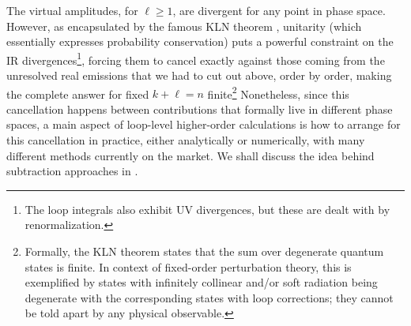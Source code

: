 %
%
%
%
%
The virtual amplitudes, for $\ell \ge 1$, are divergent
for any point in phase space. However, as encapsulated by the famous KLN theorem
\cite{Kinoshita:1962ur,Lee:1964is}, unitarity (which essentially
expresses probability conservation) puts a powerful
constraint on the IR divergences\footnote{The loop integrals also
  exhibit UV divergences, but these are dealt with by
  renormalization.}, 
forcing them to cancel exactly 
against those coming from the unresolved real emissions 
that we had to cut out above, order by order, 
making the complete answer for fixed
$k+\ell = n$ finite\footnote{Formally, the KLN theorem states that the
sum over degenerate quantum states is finite. In context of
fixed-order perturbation theory, this is exemplified by states with infinitely
collinear and/or soft radiation being degenerate with the
corresponding states with loop corrections; they cannot be told apart
by any physical observable.}
Nonetheless, since this cancellation happens
between contributions that formally live in different phase spaces, 
a main aspect of loop-level higher-order calculations is how to
arrange for this cancellation in practice, either analytically or 
numerically, with many different methods currently on the market. We
shall discuss the idea behind subtraction approaches 
in . 

